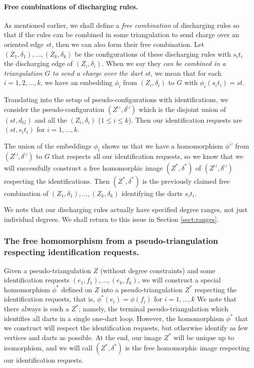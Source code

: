 \documentclass[10pt,a4paper]{article}
\begin{document}
\paragraph{Free combinations of discharging rules.}
As mentioned earlier, we shall define a \emph{free combination} of discharging rules so that if the rules can be combined in some triangulation to 
send charge over an oriented edge $st$, then we can also form their free combination. Let $(Z_1,\delta_1),\ldots,(Z_k,\delta_k)$ be the configurations of these discharging rules with $s_it_i$ the discharging edge of
$(Z_i,\delta_i)$. When we say they 
\emph{can be combined in a triangulation $G$ to send a charge over the dart $st$}, 
we mean that for each $i=1,2, \ldots ,k$, we have an embedding
$\phi_i$ from $(Z_i,\delta_i)$ to $G$ with $\phi_i(s_it_i)=st$. 

Translating into the setup of pseudo-configurations with identifications, 
we consider the pseudo-configuration $(Z^\sqcup,\delta^\sqcup)$ which is the disjoint union of $(st,d_G)$ and all the $(Z_i,\delta_i)$ ($1\le i\le k$). 
Then our identification requests are
$(st,s_it_i)$ for $i=1,\ldots,k$. 


The union of the embeddings $\phi_i$ shows us that we have a homomorphism $\phi^\sqcup$ from $(Z^\sqcup,\delta^\sqcup)$ to $G$ that respects all our identification requests, so we know that we will successfully construct a free homomorphic image $(Z^*,\delta^*)$ of $(Z^\sqcup,\delta^\sqcup)$ respecting the identifications. Then
$(Z^*,\delta^*)$ is the previously claimed free combination of $(Z_1,\delta_1),\ldots,(Z_k,\delta_k)$ identifying the darts $s_it_i$.

We note that our discharging rules actually have specified degree ranges, not just individual degrees. We shall return to this issue in Section \ref{sect:ranges}.



\subsubsection{The free homomorphism from a pseudo-triangulation respecting identification requests.}
\label{subsub:homomorphism-tri}



Given a pseudo-triangulation $Z$ (without degree constraints) and some identification requests $(e_1,f_1),\ldots,(e_k,f_k)$, we will  construct a special homomorphism $\phi^*$ defined on $Z$ into a pseudo-triangulation $Z^*$ 
respecting the identification requests, that is, $\phi^*(e_i)=\phi(f_i)$ for $i=1,\ldots,k$ 
We note that there always is such a $Z^*$; namely, the terminal pseudo-triangulation which identifies all darts in a single one-dart loop. However, the homomorphism $\phi^*$ that we construct will respect the identification requests, but otherwise identify as few vertices and darts as possible. 
At the end, our image $Z^*$ will be unique up to isomorphism, and we will call $(Z^*,\delta^*)$ is the free homomorphic image respecting our identification requests. 
\end{document}
